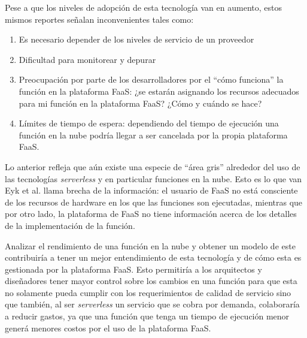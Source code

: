 Pese a que los niveles de adopción de esta tecnología van en aumento, estos mismos reportes señalan inconvenientes tales como:
\begin{enumerate}
    \item Es necesario depender de los niveles de servicio de un proveedor
    \item Dificultad para monitorear y depurar
    \item Preocupación por parte de los desarrolladores por el ``cómo funciona'' la función en la plataforma FaaS: ¿se estarán asignando los recursos adecuados para mi función en la plataforma FaaS? ¿Cómo y cuándo se hace?
    \item Límites de tiempo de espera: dependiendo del tiempo de ejecución una función en la nube podría llegar a ser cancelada por la propia plataforma FaaS.
\end{enumerate}

Lo anterior refleja que aún existe una especie de ``área gris'' alrededor del uso de las tecnologías \emph{serverless} y en particular funciones en la nube. Esto es lo que van Eyk et al.\cite{vanEyk:2018:SRC:3185768.3186308} llama brecha de la información: el usuario de FaaS no está consciente de los recursos de hardware en los que las funciones son ejecutadas, mientras que por otro lado, la plataforma de FaaS no tiene información acerca de los detalles de la implementación de la función.

Analizar el rendimiento de una función en la nube y obtener un modelo de este contribuiría a tener un mejor entendimiento de esta tecnología y de cómo esta es gestionada por la plataforma FaaS. Esto permitiría a los arquitectos y diseñadores tener mayor control sobre los cambios en una función para que esta no solamente pueda cumplir con los requerimientos de calidad de servicio sino que también, al ser \emph{serverless} un servicio que se cobra por demanda, colaboraría a reducir gastos, ya que una función que tenga un tiempo de ejecución menor generá menores costos por el uso de la plataforma FaaS.

